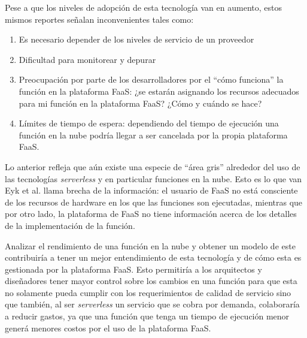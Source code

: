 Pese a que los niveles de adopción de esta tecnología van en aumento, estos mismos reportes señalan inconvenientes tales como:
\begin{enumerate}
    \item Es necesario depender de los niveles de servicio de un proveedor
    \item Dificultad para monitorear y depurar
    \item Preocupación por parte de los desarrolladores por el ``cómo funciona'' la función en la plataforma FaaS: ¿se estarán asignando los recursos adecuados para mi función en la plataforma FaaS? ¿Cómo y cuándo se hace?
    \item Límites de tiempo de espera: dependiendo del tiempo de ejecución una función en la nube podría llegar a ser cancelada por la propia plataforma FaaS.
\end{enumerate}

Lo anterior refleja que aún existe una especie de ``área gris'' alrededor del uso de las tecnologías \emph{serverless} y en particular funciones en la nube. Esto es lo que van Eyk et al.\cite{vanEyk:2018:SRC:3185768.3186308} llama brecha de la información: el usuario de FaaS no está consciente de los recursos de hardware en los que las funciones son ejecutadas, mientras que por otro lado, la plataforma de FaaS no tiene información acerca de los detalles de la implementación de la función.

Analizar el rendimiento de una función en la nube y obtener un modelo de este contribuiría a tener un mejor entendimiento de esta tecnología y de cómo esta es gestionada por la plataforma FaaS. Esto permitiría a los arquitectos y diseñadores tener mayor control sobre los cambios en una función para que esta no solamente pueda cumplir con los requerimientos de calidad de servicio sino que también, al ser \emph{serverless} un servicio que se cobra por demanda, colaboraría a reducir gastos, ya que una función que tenga un tiempo de ejecución menor generá menores costos por el uso de la plataforma FaaS.

